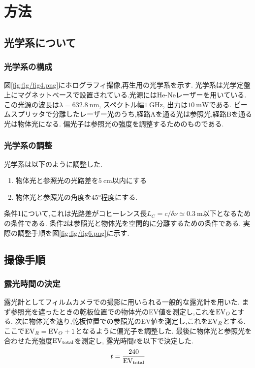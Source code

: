 \section{方法}
\subsection{光学系について}
\subsubsection{光学系の構成}
図\ref{fig:fig/fig4.png}にホログラフィ撮像,再生用の光学系を示す.
光学系は光学定盤上にマグネットベースで設置されている.光源にはHe-Neレーザーを用いている.
この光源の波長は$\lambda=632.8\ \si{\nano\metre}$, スペクトル幅$1\ \si{\giga\hertz}$, 出力は$10\ \si{\milli\watt}$である.
ビームスプリッタで分離したレーザー光のうち,経路Aを通る光は参照光,経路Bを通る光は物体光になる.
偏光子は参照光の強度を調整するためのものである.
\subsubsection{光学系の調整}
光学系は以下のように調整した.
\begin{enumerate}
  \item 物体光と参照光の光路差を$5\ \si{\centi\metre}$以内にする
  \item 物体光と参照光の角度を$45\si{\degree}$程度にする.
\end{enumerate}
条件1について,これは光路差がコヒーレンス長$L_C=c/\delta\nu\simeq0.3\ \si{\metre}$以下となるための条件である.
条件2は参照光と物体光を空間的に分離するための条件である.
実際の調整手順を図\ref{fig:fig/fig6.png}に示す.
\subsection{撮像手順}
\subsubsection{露光時間の決定}
露光計としてフィルムカメラでの撮影に用いられる一般的な露光計を用いた.
まず参照光を遮ったときの乾板位置での物体光のEV値を測定し,これを${\rm EV}_O$とする.
次に物体光を遮り,乾板位置での参照光のEV値を測定し,これを${\rm EV}_R$とする.
ここで${\rm EV}_R={\rm EV}_O+1$となるように偏光子を調整した.
最後に物体光と参照光を合わせた光強度${\rm EV}_{\rm total}$を測定し,
露光時間$t$を以下で決定した.
\begin{align}
  t=\frac{240}{{\rm EV}_{\rm total}}
\end{align}
